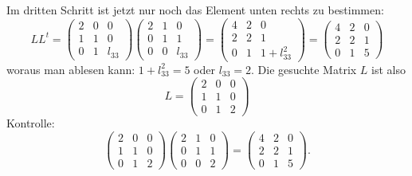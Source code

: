 \begin{loesung}
Im dritten Schritt ist jetzt nur noch das Element unten rechts zu bestimmen:
\[
LL^t=
\begin{pmatrix}
2&0&     0\\
1&1&     0\\
0&1&l_{33}
\end{pmatrix}
\begin{pmatrix}
2&1&     0\\
0&1&     1\\
0&0&l_{33}
\end{pmatrix}
=
\begin{pmatrix}
4&2&0\\
2&2&1\\
0&1&1+l_{33}^2
\end{pmatrix}
=
\begin{pmatrix}
4&2&0\\
2&2&1\\
0&1&5
\end{pmatrix}
\]
woraus man ablesen kann: $1+l_{33}^2=5$ oder $l_{33}=2$. Die gesuchte
Matrix $L$ ist also
\[
L=
\begin{pmatrix}
2&0&0\\
1&1&0\\
0&1&2
\end{pmatrix}
\]
Kontrolle:
\[
\begin{pmatrix}
2&0&0\\
1&1&0\\
0&1&2
\end{pmatrix}
\begin{pmatrix}
2&1&0\\
0&1&1\\
0&0&2
\end{pmatrix}
=
\begin{pmatrix}
4&2&0\\
2&2&1\\
0&1&5
\end{pmatrix}.
\]
\end{loesung}
